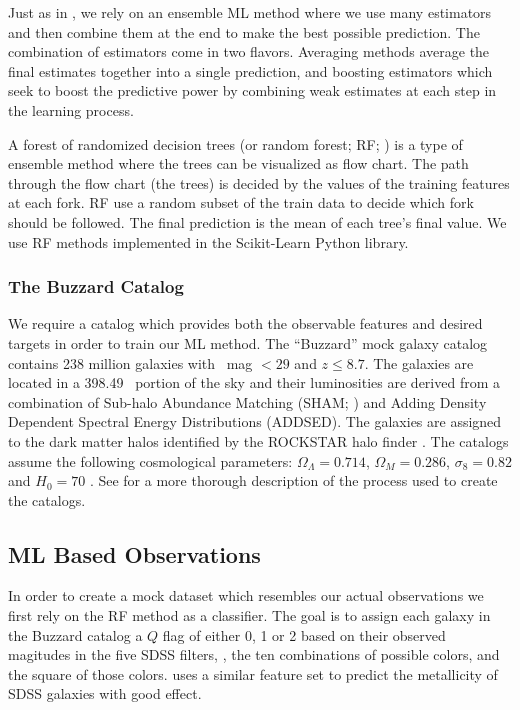Just as in , we rely on an ensemble ML method  where we use many estimators and then combine them at the end to make the best possible prediction. The combination of estimators come in two flavors. Averaging methods average the final estimates together into a single prediction, and boosting estimators which seek to boost the predictive power by combining weak estimates at each step in the learning process.

A forest of randomized decision trees (or random forest; RF; \citealt{Ho1995, Ho1998}) is a type of ensemble method where the trees can be visualized as flow chart. The path through the flow chart (the trees) is decided by the values of the training features at each fork. RF use a random subset of the train data to decide which fork should be followed. The final prediction is the mean of each tree's final value. We use RF methods implemented in the {\sc Scikit-Learn} \citep{Pedregosa2012} Python library.

\subsubsection{The Buzzard Catalog}
We require a catalog which provides both the observable features and desired targets in order to train our ML method. The ``Buzzard'' mock galaxy catalog contains 238 million galaxies with \sdssr\ mag $< 29$ and $z \leq 8.7$. The galaxies are located in a 398.49 \degsq\ portion of the sky and their luminosities are derived from a combination of Sub-halo Abundance Matching (SHAM; \citealt{Reddick2013}) and Adding Density Dependent Spectral Energy Distributions (ADDSED). The galaxies are assigned to the dark matter halos identified by the {\sc ROCKSTAR} halo finder \citep{Behroozi2013}. The catalogs assume the following cosmological parameters: $\Omega_\Lambda = 0.714$, $\Omega_M = 0.286$, $\sigma_8 = 0.82$ and $H_0= 70$ \kms \mpc. See  for a more thorough description of the process used to create the catalogs.

\subsection{ML Based Observations}
In order to create a mock dataset which resembles our actual observations we first rely on the RF method as a classifier. The goal is to assign each galaxy in the Buzzard catalog a $Q$ flag of either 0, 1 or 2 based on their observed magitudes in the five SDSS filters, \sdssu\sdssg\sdssr\sdssi\sdssz, the ten combinations of possible colors, and the square of those colors. \cite{Acquaviva2016} uses a similar feature set to predict the metallicity of SDSS galaxies with good effect. 

